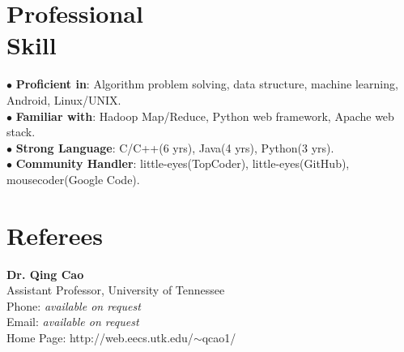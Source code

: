 \documentclass[margin,line]{resume}
\begin{document}
\begin{resume}
    \section{\mysidestyle Professional \\Skill} 
	
	$\bullet$ \textbf{Proficient in}: Algorithm problem solving, data structure, machine learning, Android, Linux/UNIX.\vspace{0mm}\\
	$\bullet$ \textbf{Familiar with}: Hadoop Map/Reduce, Python web framework, Apache web stack.\vspace{0mm}\\
    $\bullet$ \textbf{Strong Language}: C/C++(6 yrs), Java(4 yrs), Python(3 yrs).\vspace{0mm}\\
	$\bullet$ \textbf{Community Handler}: little-eyes(TopCoder), little-eyes(GitHub), mousecoder(Google Code).\vspace{0mm}\\






\section{\mysidestyle Referees} 

\textbf{Dr. Qing Cao}\\
Assistant Professor, University of Tennessee\\
Phone: \textsl{available on request}\\
Email: \textsl{available on request}\\
Home Page: http://web.eecs.utk.edu/$\sim$qcao1/

\end{resume}
\end{document}
